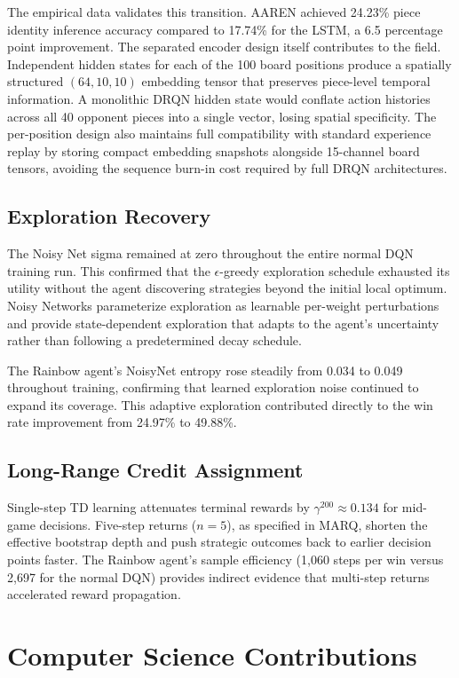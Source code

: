 The empirical data validates this transition. AAREN achieved 24.23\% piece identity inference accuracy compared to 17.74\% for the LSTM, a 6.5 percentage point improvement. The separated encoder design itself contributes to the field. Independent hidden states for each of the 100 board positions produce a spatially structured $(64, 10, 10)$ embedding tensor that preserves piece-level temporal information. A monolithic DRQN hidden state would conflate action histories across all 40 opponent pieces into a single vector, losing spatial specificity. The per-position design also maintains full compatibility with standard experience replay by storing compact embedding snapshots alongside 15-channel board tensors, avoiding the sequence burn-in cost required by full DRQN architectures.

\subsection{Exploration Recovery}

The Noisy Net sigma remained at zero throughout the entire normal DQN training run. This confirmed that the $\epsilon$-greedy exploration schedule exhausted its utility without the agent discovering strategies beyond the initial local optimum. Noisy Networks parameterize exploration as learnable per-weight perturbations and provide state-dependent exploration that adapts to the agent's uncertainty rather than following a predetermined decay schedule.

The Rainbow agent's NoisyNet entropy rose steadily from 0.034 to 0.049 throughout training, confirming that learned exploration noise continued to expand its coverage. This adaptive exploration contributed directly to the win rate improvement from 24.97\% to 49.88\%.

\subsection{Long-Range Credit Assignment}

Single-step TD learning attenuates terminal rewards by $\gamma^{200} \approx 0.134$ for mid-game decisions. Five-step returns ($n = 5$), as specified in MARQ, shorten the effective bootstrap depth and push strategic outcomes back to earlier decision points faster. The Rainbow agent's sample efficiency (1,060 steps per win versus 2,697 for the normal DQN) provides indirect evidence that multi-step returns accelerated reward propagation.


\section{Computer Science Contributions}

